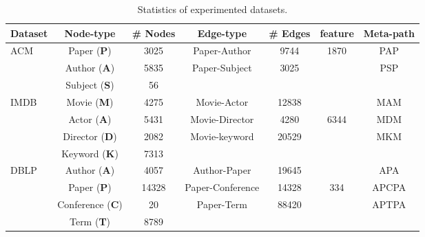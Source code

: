 \documentclass[conference]{IEEEtran}
\begin{document}
	\begin{table}[h]
\centering
\caption{Statistics of experimented datasets.}
\tiny
\begin{tabular}{l|ccccc|c}
			\toprule
Dataset  & Node-type & \# Nodes & Edge-type & \# Edges & feature & Meta-path\\
			\midrule
			\multirow{3}{*}{ACM} & Paper (\textbf{P}) & 3025 & \multirow{1.8}{*}{Paper-Author} & \multirow{1.8}{*}{9744} & \multirow{1.8}{*}{1870} &  \multirow{1.8}{*}{PAP}  \\
			& Author (\textbf{A})  & 5835 & \multirow{1.8}{*}{Paper-Subject}  & \multirow{1.8}{*}{3025} & & \multirow{1.8}{*}{PSP} \\
			& Subject (\textbf{S})  & 56 &  & & & \\
			\midrule
			\multirow{4}{*}{IMDB} & Movie (\textbf{M}) & 4275 & \multirow{1.8}{*}{Movie-Actor} & \multirow{1.8}{*}{12838} &  &  \multirow{1.8}{*}{MAM} \\
			& Actor (\textbf{A}) & 5431 & \multirow{1.8}{*}{Movie-Director}  & \multirow{1.8}{*}{4280} & \multirow{2}{*}{6344}& \multirow{1.8}{*}{MDM}\\
			& Director (\textbf{D}) & 2082 &\multirow{1.8}{*}{Movie-keyword}  & \multirow{1.8}{*}{20529} & & \multirow{1.8}{*}{MKM}\\
			& Keyword (\textbf{K}) & 7313 &  &  & &\\
			\midrule
			\multirow{4}{*}{DBLP} & Author (\textbf{A}) & 4057 & \multirow{1.8}{*}{Author-Paper} & \multirow{1.8}{*}{19645} &  &  \multirow{1.8}{*}{APA} \\
			& Paper (\textbf{P}) & 14328 & \multirow{1.8}{*}{Paper-Conference}  & \multirow{1.8}{*}{14328}& \multirow{2}{*}{334} & \multirow{1.8}{*}{APCPA} \\
			& Conference (\textbf{C}) & 20 &\multirow{1.8}{*}{Paper-Term}  & \multirow{1.8}{*}{88420} & & \multirow{1.8}{*}{APTPA}\\
			& Term (\textbf{T}) & 8789 &  & & & \\
\bottomrule
		\end{tabular}
\label{tab:dataset}
	\end{table}
	
\end{document}
